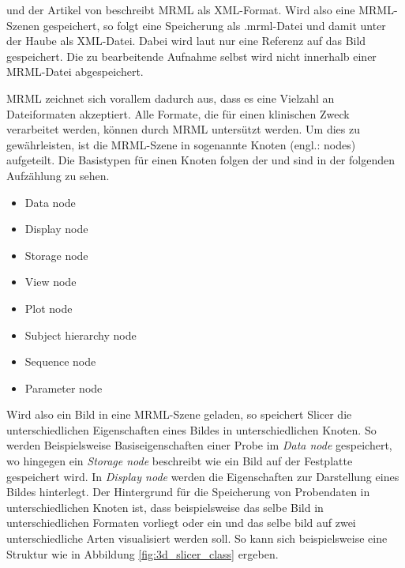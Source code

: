\citet{slicer2024} und der Artikel von \citet[Seite 1327]{fedorov2012slicer}
beschreibt \ac{MRML} als \ac{XML}-Format. Wird also eine \ac{MRML}-Szenen
gespeichert, so folgt eine Speicherung als .mrml-Datei und damit unter der Haube
als XML-Datei. Dabei wird laut \citet{slicer2024} nur eine Referenz auf das Bild
gespeichert. Die zu bearbeitende Aufnahme selbst wird nicht innerhalb einer \ac{MRML}-Datei
abgespeichert.

\ac{MRML} zeichnet sich vorallem dadurch aus, dass es eine Vielzahl an
Dateiformaten akzeptiert. Alle Formate, die für einen klinischen Zweck
verarbeitet werden, können durch \ac{MRML} untersützt werden. Um dies zu gewährleisten,
ist die \ac{MRML}-Szene in sogenannte Knoten (engl.: nodes) aufgeteilt. Die
Basistypen für einen Knoten folgen der \citet{slicer2024} und sind in der folgenden
Aufzählung zu sehen.

\begin{minipage}{0.45\textwidth}
	\begin{itemize}
		\item Data node

		\item Display node

		\item Storage node

		\item View node
	\end{itemize}
\end{minipage}
\hfill
\begin{minipage}{0.45\textwidth}
	\begin{itemize}
		\item Plot node

		\item Subject hierarchy node

		\item Sequence node

		\item Parameter node
	\end{itemize}
\end{minipage}

Wird also ein Bild in eine \ac{MRML}-Szene geladen, so speichert Slicer die
unterschiedlichen Eigenschaften eines Bildes in unterschiedlichen Knoten. So werden
Beispielsweise Basiseigenschaften einer Probe im \textit{Data node} gespeichert,
wo hingegen ein \textit{Storage node} beschreibt wie ein Bild auf der Festplatte
gespeichert wird. In \textit{Display node} werden die Eigenschaften zur
Darstellung eines Bildes hinterlegt. Der Hintergrund für die Speicherung von Probendaten
in unterschiedlichen Knoten ist, dass beispielsweise das selbe Bild in
unterschiedlichen Formaten vorliegt oder ein und das selbe bild auf zwei
unterschiedliche Arten visualisiert werden soll. So kann sich beispielsweise eine
Struktur wie in Abbildung \ref{fig:3d_slicer_class} ergeben.


